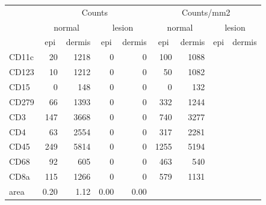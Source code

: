 \documentclass{article}
\begin{document}
\begin{tabular}{lrrrr|rrrr}
   \hline
 
         \multicolumn{1}{c}{} & \multicolumn{4}{c|}{Counts} & \multicolumn{4}{c}{Counts/mm2} \\ 
         \multicolumn{1}{c}{} & \multicolumn{2}{c}{normal} & \multicolumn{2}{c|}{lesion} & \multicolumn{2}{c}{normal} & \multicolumn{2}{c}{lesion}  \\ 
         \multicolumn{1}{c}{} & \multicolumn{1}{c}{epi} & dermis & \multicolumn{1}{c}{epi} & \multicolumn{1}{c|}{dermis} & \multicolumn{1}{c}{epi} & dermis & \multicolumn{1}{c}{epi} & dermis  \\ 
         \hline
    CD11c & 20 & 1218 & 0 & 0 & 100 & 1088 &  &  \\ 
  CD123 & 10 & 1212 & 0 & 0 & 50 & 1082 &  &  \\ 
  CD15 & 0 & 148 & 0 & 0 & 0 & 132 &  &  \\ 
  CD279 & 66 & 1393 & 0 & 0 & 332 & 1244 &  &  \\ 
  CD3 & 147 & 3668 & 0 & 0 & 740 & 3277 &  &  \\ 
  CD4 & 63 & 2554 & 0 & 0 & 317 & 2281 &  &  \\ 
  CD45 & 249 & 5814 & 0 & 0 & 1255 & 5194 &  &  \\ 
  CD68 & 92 & 605 & 0 & 0 & 463 & 540 &  &  \\ 
  CD8a & 115 & 1266 & 0 & 0 & 579 & 1131 &  &  \\ 
  area & 0.20 & 1.12 & 0.00 & 0.00 &    &    &    &    \\ 
   \hline
\end{tabular}
\end{document}
